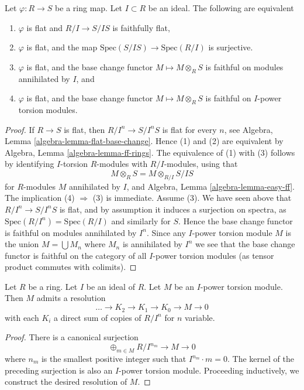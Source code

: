 \begin{lemma}
\label{lemma-characterize-flatness-on-torsion}
Let $\varphi : R \to S$ be a ring map. Let $I \subset R$ be an ideal.
The following are equivalent
\begin{enumerate}
\item $\varphi$ is flat and $R/I \to S/IS$ is faithfully flat,
\item $\varphi$ is flat, and the map
$\text{Spec}(S/IS) \to \text{Spec}(R/I)$ is surjective.
\item $\varphi$ is flat, and the base change functor
$M \mapsto M \otimes_R S$ is faithful on modules annihilated by $I$, and
\item $\varphi$ is flat, and the base change functor
$M \mapsto M \otimes_R S$ is faithful on $I$-power torsion modules.
\end{enumerate}
\end{lemma}

\begin{proof}
If $R \to S$ is flat, then $R/I^n \to S/I^nS$ is flat for every $n$, see
Algebra, Lemma \ref{algebra-lemma-flat-base-change}.
Hence (1) and (2) are equivalent by
Algebra, Lemma \ref{algebra-lemma-ff-rings}.
The equivalence of (1) with (3) follows by identifying $I$-torsion
$R$-modules with $R/I$-modules, using that
$$
M \otimes_R S = M \otimes_{R/I} S/IS
$$ 
for $R$-modules $M$ annihilated by $I$, and
Algebra, Lemma \ref{algebra-lemma-easy-ff}.
The implication (4) $\Rightarrow$ (3) is immediate. Assume (3). We have
seen above that $R/I^n \to S/I^nS$ is flat, and by assumption it induces
a surjection on spectra, as $\text{Spec}(R/I^n) = \text{Spec}(R/I)$ and
similarly for $S$. Hence the base change functor is faithful on modules
annihilated by $I^n$. Since any $I$-power torsion module $M$ is the union
$M = \bigcup M_n$ where $M_n$ is annihilated by $I^n$ we see that the base
change functor is faithful on the category of all $I$-power torsion modules
(as tensor product commutes with colimits).
\end{proof}

\begin{lemma}
\label{lemma-I-power-torsion-presentation}
Let $R$ be a ring.
Let $I$ be an ideal of $R$.
Let $M$ be an $I$-power torsion module.
Then $M$ admits a resolution
$$
\ldots \to K_2 \to K_1 \to K_0 \to M \to 0
$$
with each $K_i$ a direct sum of copies of $R/I^n$ for $n$ variable.
\end{lemma}

\begin{proof}
There is a canonical surjection
$$
\oplus_{m \in M} R/I^{n_m} \to M \to 0
$$
where $n_m$ is the smallest positive integer such that $I^{n_m} \cdot m = 0$.
The kernel of the preceding surjection is also an $I$-power torsion module.
Proceeding inductively, we construct the desired resolution of $M$.
\end{proof}


